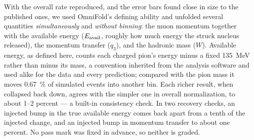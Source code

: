 With the overall rate reproduced, and the error bars found close in size to the published ones, we used OmniFold's defining ability and unfolded several quantities \emph{simultaneously} and \emph{without binning}: the muon momentum together with the available energy ($E_{\mathrm{avail}}$, roughly how much energy the struck nucleus released), the momentum transfer ($q_{3}$), and the hadronic mass ($W$). Available energy, as defined here, counts each charged pion's energy minus a fixed \SI{135}{MeV} rather than minus its mass, a convention inherited from the analysis software and used alike for the data and every prediction; compared with the pion mass it moves \SI{0.67}{\percent} of simulated events into another bin. Each richer result, when collapsed back down, agrees with the simpler one in overall normalization, to about 1--2 percent --- a built-in consistency check. In two recovery checks, an injected bump in the true available energy comes back apart from a tenth of the injected change, and an injected bump in momentum transfer to about one percent. No pass mark was fixed in advance, so neither is graded.

